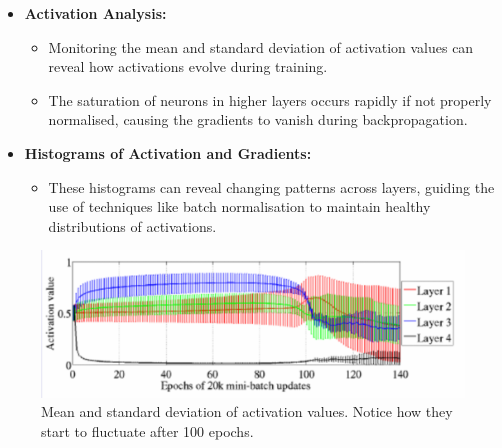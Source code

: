 \begin{figure}[H]
    \centering
{}
\end{figure}

\begin{itemize}
    \item \textbf{Activation Analysis:}
    \begin{itemize}
        \item Monitoring the mean and standard deviation of activation values can reveal how activations evolve during training.
        \item The saturation of neurons in higher layers occurs rapidly if not properly normalised, causing the gradients to vanish during backpropagation.
    \end{itemize}
    \item \textbf{Histograms of Activation and Gradients:}
    \begin{itemize}
        \item These histograms can reveal changing patterns across layers, guiding the use of techniques like batch normalisation to maintain healthy distributions of activations.
    \end{itemize}
\end{itemize}

\begin{figure}[H]
    \centering
    \includegraphics[width=0.75\linewidth]{img/distprob.png}
    \caption{Mean and standard deviation of activation values. Notice how they start to fluctuate after 100 epochs.}
    \label{fig:distprob}
\end{figure}

